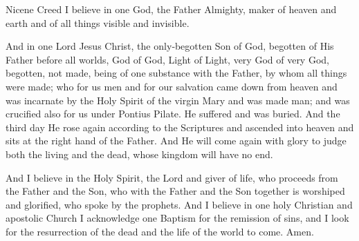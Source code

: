Nicene Creed
I believe in one God, the Father Almighty, maker of heaven and earth and of all things visible 
and invisible. 
  
And in one Lord Jesus Christ, the only‐begotten Son of God, begotten of His Father before all 
worlds, God of God, Light of Light, very God of very God, begotten, not made, being of one 
substance with the Father, by whom all things were made; who for us men and for our 
salvation came down from heaven and was incarnate by the Holy Spirit of the virgin Mary 
and was made man; and was crucified also for us under Pontius Pilate. He suffered and was 
buried. And the third day He rose again according to the Scriptures and ascended into 
heaven and sits at the right hand of the Father. And He will come again with glory to judge 
both the living and the dead, whose kingdom will have no end. 
  
And I believe in the Holy Spirit, the Lord and giver of life, who proceeds from the Father and 
the Son, who with the Father and the Son together is worshiped and glorified, who spoke by 
the prophets. And I believe in one holy Christian and apostolic Church I acknowledge one 
Baptism for the remission of sins, and I look for the resurrection of the dead and the life of 
the world to come. Amen.
